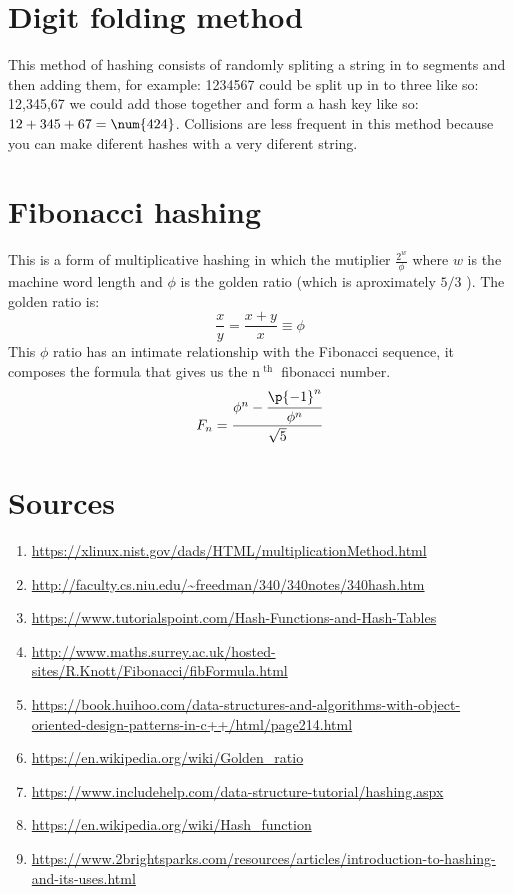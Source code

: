 \documentclass{article}
\begin{document}
\section{Digit folding method}
This method of hashing consists of randomly spliting a string in to segments and then adding them, for example: 1234567 could be split up in to three like so: 12,345,67 we could add those together and form a hash key like so: $12+345+67 = \num{\fpeval{12+345+67}}$. Collisions are less frequent in this method because you can make diferent hashes with a very diferent string. 


\section{Fibonacci hashing}
This is a form of multiplicative hashing in which the mutiplier $\displaystyle \frac{2^{w}}{\phi } $  where $w$ is the machine word length and $\phi$ is the golden ratio (which is aproximately $5/3$ ).\newline 
The golden ratio is: 
\[
  \frac{x}{y} = \frac{x+y}{x} \equiv \phi 
\]
This $\phi$ ratio has an intimate relationship with the Fibonacci sequence, it composes the formula that gives us the n$^{\text{ th }}$ fibonacci number. 
\[
  F_n = \frac{\phi ^n - \cfrac{\p{-1} ^n}{\phi ^n}}{\sqrt{5}} 
\]




\section{Sources}
\begin{enumerate}
    \item \url{https://xlinux.nist.gov/dads/HTML/multiplicationMethod.html}
    \item \url{http://faculty.cs.niu.edu/~freedman/340/340notes/340hash.htm}
    \item \url{https://www.tutorialspoint.com/Hash-Functions-and-Hash-Tables}
    \item \url{http://www.maths.surrey.ac.uk/hosted-sites/R.Knott/Fibonacci/fibFormula.html}
    \item \url{https://book.huihoo.com/data-structures-and-algorithms-with-object-oriented-design-patterns-in-c++/html/page214.html}
    \item \url{https://en.wikipedia.org/wiki/Golden_ratio}
    \item \url{https://www.includehelp.com/data-structure-tutorial/hashing.aspx}
    \item \url{https://en.wikipedia.org/wiki/Hash_function}
    \item \url{https://www.2brightsparks.com/resources/articles/introduction-to-hashing-and-its-uses.html}
\end{enumerate}





\end{document}

